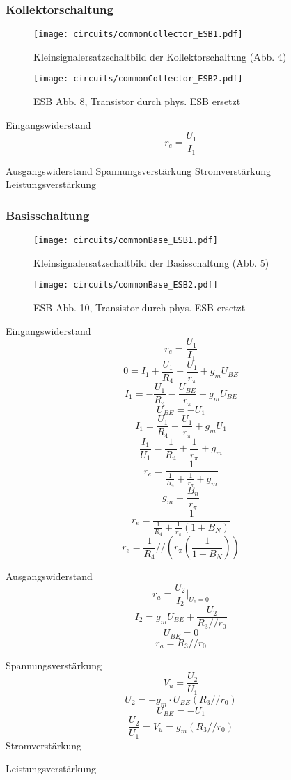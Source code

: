 \subsubsection{Kollektorschaltung}
\begin{figure}[H]
  \begin{center}
    \texttt{[image: circuits/commonCollector\_ESB1.pdf]}
  \end{center}
  \caption{Kleinsignalersatzschaltbild der Kollektorschaltung (Abb. 4)}
\end{figure}


\begin{figure}[H]
  \begin{center}
   \texttt{[image: circuits/commonCollector\_ESB2.pdf]}
  \end{center}
  \caption{ESB Abb. 8, Transistor durch phys. ESB ersetzt}
\end{figure}
\noindent Eingangswiderstand
\[ r_e = \frac{U_1}{I_1}\]

\noindent Ausgangswiderstand
\noindent Spannungsverstärkung
\noindent Stromverstärkung
\noindent Leistungsverstärkung

\subsubsection{Basisschaltung}
\begin{figure}[H]
  \begin{center}
    \texttt{[image: circuits/commonBase\_ESB1.pdf]}
  \end{center}
  \caption{Kleinsignalersatzschaltbild der Basisschaltung (Abb. 5)}
\end{figure}

\begin{figure}[H]
  \begin{center}
    \texttt{[image: circuits/commonBase\_ESB2.pdf]}
  \end{center}
  \caption{ESB Abb. 10, Transistor durch phys. ESB ersetzt}
\end{figure}

\noindent Eingangswiderstand
\[ r_e = \frac{U_1}{I_1}\]
\[0 = I_1 + \frac{U_1}{R_4} + \frac{U_1}{r_\pi} + g_m U_{BE} \]
\[I_1 = - \frac{U_1}{R_4} - \frac{U_{BE}}{r_\pi} - g_m U_{BE} \]
\[U_{BE} = - U_1\]
\[I_1 = \frac{U_1}{R_4} + \frac{U_1}{r_\pi} + g_m U_{1} \]
\[ \frac{I_1}{U_1} = \frac{1}{R_4} + \frac{1}{r_\pi} + g_m \]
\[ r_e = \frac{1}{ \frac{1}{R_4} + \frac{1}{r_\pi} + g_m} \]
\[g_m = \frac{B_n}{r_\pi}\]
\[ r_e = \frac{1}{\frac{1}{R_4} + \frac{1}{r_\pi} (1+B_N)} \]
\[ r_e = \frac{1}{R_4} // (r_\pi (\frac{1}{1+B_N}))\]

\noindent Ausgangswiderstand
\[ r_a = \frac{U_2}{I_2}|_{U_e = 0}\]
\[ I_2 = g_m U_{BE} + \frac{U_2}{R_3 // r_0}\]
\[ U_{BE} = 0\]
\[ r_a = R_3 // r_0\]

\noindent Spannungsverstärkung
\[V_u = \frac{U_2}{U_1}\]
\[U_2 = -g_m \cdot U_{BE} (R_3 // r_0)\]
\[U_{BE} = - U_{1}\]
\[ \frac{U_2}{U_1} = V_u = g_m (R_3 // r_0)\]
\noindent Stromverstärkung

\noindent Leistungsverstärkung